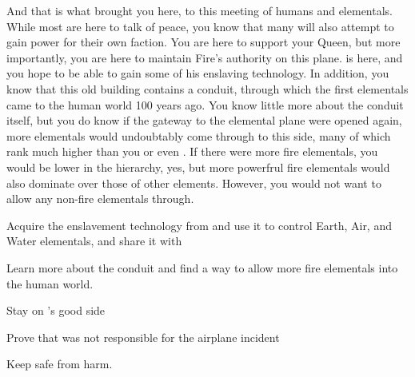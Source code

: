 \documentclass[char]{elementals}
\begin{document}
And that is what brought you here, to this meeting of humans and elementals.  While most are here to talk of peace, you know that many will also attempt to gain power for their own faction.  You are here to support your Queen, but more importantly, you are here to maintain Fire's authority on this plane.  \cmadScientist{} is here, and you hope to be able to gain some of his enslaving technology.  In addition, you know that this old building contains a conduit, through which the first elementals came to the human world 100 years ago.  You know little more about the conduit itself, but you do know if the gateway to the elemental plane were opened again, more elementals would undoubtably come through to this side, many of which rank much higher than you or even \cQueen{}.  If there were more fire elementals, you would be lower in the hierarchy, yes, but more powerfrul fire elementals would also dominate over those of other elements.  However, you would not want to allow any non-fire elementals through.

\begin{itemz}[Goals]
  \item Acquire the enslavement technology from \madScientist{} and use it to control Earth, Air, and Water elementals, and share it with \cQueen{}
  \item Learn more about the conduit and find a way to allow more fire elementals into the human world.
  \item Stay on \cQueen{}'s good side
  \item Prove that \cJuliet{} was not responsible for the airplane incident 
  \item Keep \cJuliet{} safe from harm.
\end{itemz}
\end{document}
